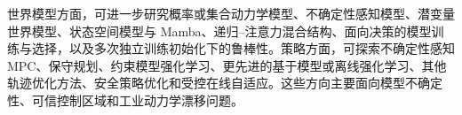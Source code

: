 世界模型方面，可进一步研究概率或集合动力学模型、不确定性感知模型、潜变量世界模型、状态空间模型与 Mamba、递归--注意力混合结构、面向决策的模型训练与选择，以及多次独立训练初始化下的鲁棒性。策略方面，可探索不确定性感知 MPC、保守规划、约束模型强化学习、更先进的基于模型或离线强化学习、其他轨迹优化方法、安全策略优化和受控在线自适应。这些方向主要面向模型不确定性、可信控制区域和工业动力学漂移问题。

